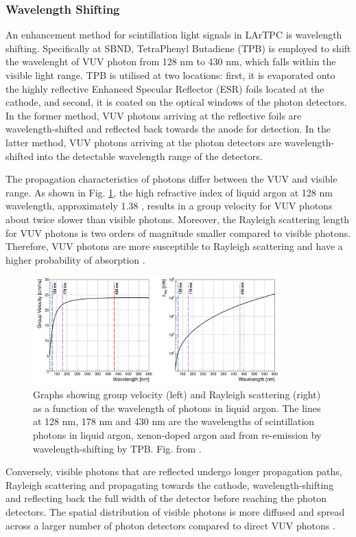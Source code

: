 \subsubsection{Wavelength Shifting}
\label{sec:wls}

An enhancement method for scintillation light signals in LArTPC is wavelength shifting.
Specifically at SBND, TetraPhenyl Butadiene (TPB) is employed to shift the wavelenght of VUV photon from 128 nm to 430 nm, which falls within the visible light range.
TPB is utilised at two locations: first, it is evaporated onto the highly reflective Enhanced Specular Reflector (ESR) foils located at the cathode, and second, it is coated on the optical windows of the photon detectors. 
In the former method, VUV photons arriving at the reflective foils are wavelength-shifted and reflected back towards the anode for detection.
In the latter method,  VUV photons arriving at the photon detectors are wavelength-shifted into the detectable wavelength range of the detectors.

The propagation characteristics of photons differ between the VUV and visible range.
As shown in Fig. \ref{fig:vuv_visible}, the high refractive index of liquid argon at 128 nm wavelength, approximately 1.38 \cite{lar_index}, results in a group velocity for VUV photons about twice slower than visible photons.
Moreover, the Rayleigh scattering length for VUV photons is two orders of magnitude smaller compared to visible photons.
Therefore, VUV photons are more susceptible to Rayleigh scattering and have a higher probability of absorption \cite{PatrickPhD}.
\begin{figure}[htp] 
\centering    
\includegraphics[width=0.85\textwidth]{vuv_visible}
\caption[vuv_visible]{
Graphs showing group velocity (left) and Rayleigh scattering (right) as a function of the wavelength of photons in liquid argon.
The lines at 128 nm, 178 nm and 430 nm are the wavelengths of scintillation photons in liquid argon, xenon-doped argon and from re-emission by wavelength-shifting by TPB. 
Fig. from \cite{PatrickPhD}.
}
\label{fig:vuv_visible}
\end{figure}
Conversely, visible photons that are reflected undergo longer propagation paths, Rayleigh scattering and propagating towards the cathode, wavelength-shifting and reflecting back the full width of the detector before reaching the photon detectors.
The spatial distribution of visible photons is more diffused and spread across a larger number of photon detectors compared to direct VUV photons \cite{PatrickPhD}.

